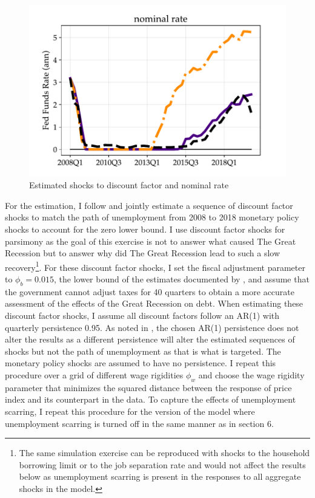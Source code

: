 \begin{figure}[t]
\begin{center}
\begin{minipage}{0.5\textwidth}
\end{minipage}\hspace*{\fill}
\begin{minipage}{0.5\textwidth}
\includegraphics[scale=.5]{text/chapter1/Figures/GR_sim/FedFunds}
\end{minipage}
\caption{Estimated shocks to discount factor and nominal rate} 
\label{Estimatedshks}
\end{center}
\end{figure}


For the estimation, I follow \cite{kekre2023} and jointly estimate a sequence of discount factor shocks to match the path of unemployment from 2008 to 2018 monetary policy shocks to account for the zero lower bound. I use discount factor shocks for parsimony as the goal of this exercise is not to answer what caused The Great Recession but to answer why did The Great Recession lead to such a slow recovery\footnote{The same simulation exercise can be reproduced with shocks to the household borrowing limit or to the job separation rate and would not affect the results below as unemployment scarring is present in the responses to all aggregate shocks in the model.}. For these discount factor shocks, I set the fiscal adjustment parameter to $\phi_{b} = 0.015$, the lower bound of the estimates documented by  \cite{AuclertMicroJumpsMacroHumps}, and assume that the government cannot adjust taxes for 40 quarters to obtain a more accurate assessment of the effects of the Great Recession on debt. When estimating these discount factor shocks, I assume all discount factors follow an AR(1) with quarterly persistence 0.95. As noted in \cite{kekre2023}, the chosen AR(1) persistence does not alter the results as a different persistence will alter the estimated sequences of shocks but not the path of unemployment as that is what is targeted. The monetary policy shocks are assumed to have no persistence. I repeat this procedure over a grid of different wage rigidities $\phi_{w}$ and choose the wage rigidity parameter that minimizes the squared distance between the response of price index and its counterpart in the data. To capture the effects of unemployment scarring, I repeat this procedure for the version of the model where unemployment scarring is turned off in the same manner as in section 6. 


